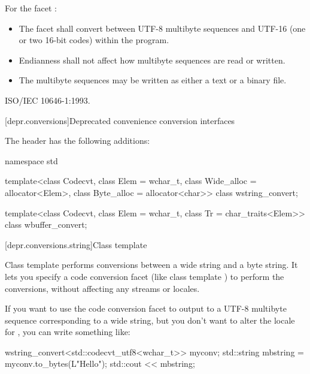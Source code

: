 \pnum
For the facet :
\begin{itemize}
\item
  The facet shall convert between UTF-8 multibyte sequences
  and UTF-16 (one or two 16-bit codes) within the program.
\item
  Endianness shall not affect how multibyte sequences are read or written.
\item
  The multibyte sequences may be written as either a text or a binary file.
\end{itemize}

\xref ISO/IEC 10646-1:1993.

[depr.conversions]{Deprecated convenience conversion interfaces}

\pnum
The header  has the following additions:

\begin{codeblock}
namespace std {
  template<class Codecvt, class Elem = wchar_t,
           class Wide_alloc = allocator<Elem>,
           class Byte_alloc = allocator<char>>
    class wstring_convert;

  template<class Codecvt, class Elem = wchar_t,
           class Tr = char_traits<Elem>>
    class wbuffer_convert;
}
\end{codeblock}

[depr.conversions.string]{Class template }

\pnum
Class template  performs conversions between a wide
string and a byte string. It lets you specify a code conversion facet
(like class template ) to perform the conversions, without
affecting any streams or locales. \begin{example} If you want to use the code
conversion facet  to output to  a UTF-8
multibyte sequence corresponding to a wide string, but you don't want to
alter the locale for , you can write something like:
\begin{codeblock}
wstring_convert<std::codecvt_utf8<wchar_t>> myconv;
std::string mbstring = myconv.to_bytes(L"Hello\n");
std::cout << mbstring;
\end{codeblock}
\end{example}

